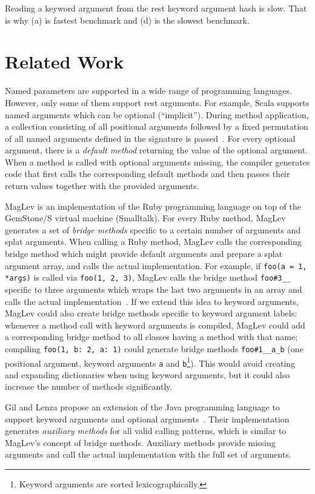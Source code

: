 \documentclass[10pt]{sigplanconf}
\begin{document}
Reading a keyword argument from the rest keyword argument hash is slow. That is why (a) is fastest benchmark and (d) is the slowest benchmark.

\section{Related Work}
Named parameters are supported in a wide range of programming languages. However, only some of them support rest arguments. For example, Scala supports named arguments which can be optional (``implicit''). During method application, a collection consisting of all positional arguments followed by a fixed permutation of all named arguments defined in the signature is passed~\cite{Rytz:2010:NDA:1774088.1774529}. For every optional argument, there is a \emph{default method} returning the value of the optional argument. When a method is called with optional arguments missing, the compiler generates code that first calls the corresponding default methods and then passes their return values together with the provided arguments.

MagLev is an implementation of the Ruby programming language on top of the GemStone/S virtual machine (Smalltalk). For every Ruby method, MagLev generates a set of \emph{bridge methods} specific to a certain number of arguments and splat arguments. When calling a Ruby method, MagLev calls the corresponding bridge method which might provide default arguments and prepare a splat argument array, and calls the actual implementation. For example, if \lstinline{foo(a = 1, *args)} is called via \lstinline{foo(1, 2, 3)}, MagLev calls the bridge method \lstinline{foo#3__} specific to three arguments which wraps the last two arguments in an array and calls the actual implementation~\cite{SprBachelor}. If we extend this idea to keyword arguments, MagLev could also create bridge methods specific to keyword argument labels: whenever a method call with keyword arguments is compiled, MagLev could add a corresponding bridge method to all classes having a method with that name; \eg compiling \lstinline{foo(1, b: 2, a: 1)} could generate bridge methods \lstinline{foo#1__a_b} (one positional argument, keyword arguments \lstinline{a} and \lstinline{b}\footnote{Keyword arguments are sorted lexicographically.}). This would avoid creating and expanding dictionaries when using keyword arguments, but it could also increase the number of methods significantly.

Gil and Lenza propose an extension of the Java programming language to support keyword arguments and optional arguments~\cite{JOT:issue_2012_04/article1}. Their implementation generates \emph{auxiliary methods} for all valid calling patterns, which is similar to MagLev's concept of bridge methods. Auxiliary methods provide missing arguments and call the actual implementation with the full set of arguments.
\end{document}
